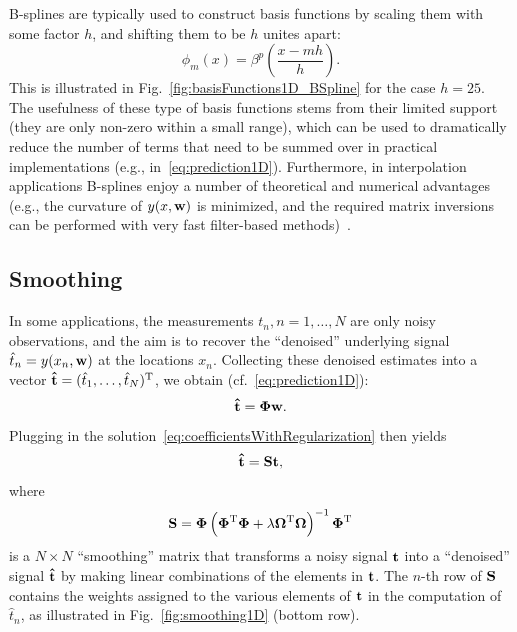 \documentclass[10pt,twoside]{book}
\begin{document}
B-splines are typically used to construct basis functions by scaling them with some factor $h$, and shifting them to be $h$ unites apart:
\begin{equation}
\phi_m(x) = \beta^p \left( \frac{x - m h}{h} \right).
\label{eq:BsplineBasisFunction}
\end{equation}
%
This is illustrated in Fig.~\ref{fig:basisFunctions1D_BSpline} for the case $h=25$.
%
The usefulness of these type of basis functions stems from their limited support (they are only non-zero within a small range), which can be used to dramatically reduce the number of terms that need to be summed over 
in practical implementations (e.g., in~\eqref{eq:prediction1D}).
Furthermore, in interpolation applications B-splines enjoy a number of theoretical and numerical advantages (e.g., the curvature of $y( x, \mathbf{w} )$ is minimized, and the required matrix inversions can be performed with very fast filter-based methods)~\cite{UnserSPM1999}.


\subsection{Smoothing}

In some applications, the measurements 
$t_n, n=1,\ldots,N$
are only noisy observations, 
and the aim is to recover the ``denoised'' underlying signal $\hat{t}_n = y( x_n, \mathbf{w} )$ at the locations $x_n$.
%
Collecting these denoised estimates into a vector
$\mathbf{\hat{t}} = (\hat{t}_1, \ldots, \hat{t}_N)^\mathrm{T}$,
we obtain (cf.~\eqref{eq:prediction1D}):
\begin{equation}
\mathbf{\hat{t}} = {\mbox{\boldmath {${\Phi}$}}} \mathbf{w}
.
\label{eq:smoothingExpansion}
\end{equation}
Plugging in the solution~\eqref{eq:coefficientsWithRegularization} then yields
$$
\mathbf{\hat{t}} 
= 
\mathbf{S} \mathbf{t},
$$
where
$$
\mathbf{S} = 
{\mbox{\boldmath {${\Phi}$}}} 
\left( {\mbox{\boldmath {${\Phi}$}}}^\mathrm{T} {\mbox{\boldmath {${\Phi}$}}} + \lambda {\mbox{\boldmath {${\Omega}$}}}^\mathrm{T} {\mbox{\boldmath {${\Omega}$}}} \right)^{-1}
{\mbox{\boldmath {${\Phi}$}}}^\mathrm{T}
$$
is a $N \times N$ ``smoothing'' matrix that transforms a noisy signal $\mathbf{t}$ into a ``denoised'' signal $\mathbf{\hat{t}}$ by making linear combinations of the elements in $\mathbf{t}$. The $n$-th row of $\mathbf{S}$ contains the weights assigned to the various elements of $\mathbf{t}$ in the computation of $\hat{t}_n$, as illustrated in Fig.~\ref{fig:smoothing1D} (bottom row).
\end{document}
